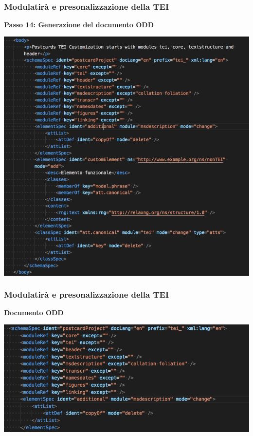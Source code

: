 \begin{frame}
    \frametitle{Modulatirà e presonalizzazione della TEI}
    \addtocounter{nframe}{1}
    
    \textbf{Passo 14: Generazione del documento ODD}

     \begin{center}
        \includegraphics[width=.7\textwidth]{imgs/CustomizationODD.png}
     \end{center}
    
\end{frame}


\begin{frame}
    \frametitle{Modulatirà e presonalizzazione della TEI}
    \addtocounter{nframe}{1}
    
    \textbf{Documento ODD}

     \begin{center}
        \includegraphics[width=.95\textwidth]{imgs/CustomizationODD-1.png}
     \end{center}
    
\end{frame}

